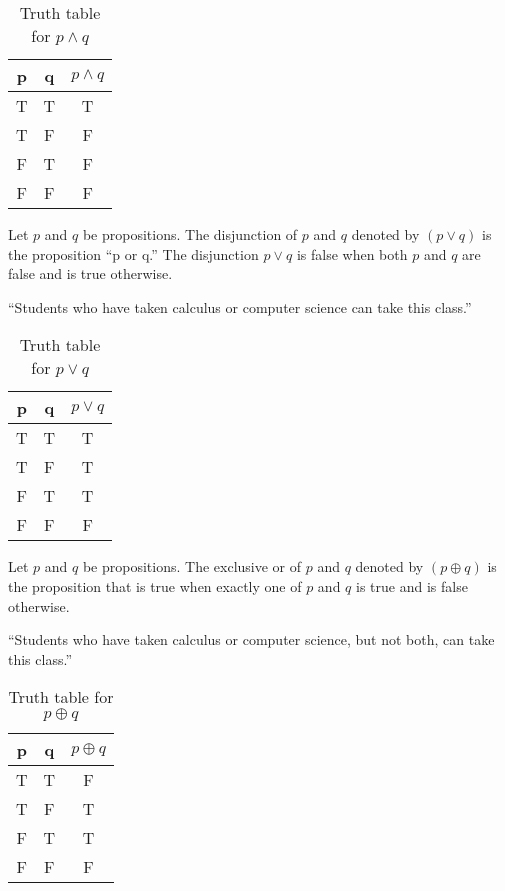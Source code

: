 \documentclass[../main-sheet.tex]{subfiles}
\begin{document}
\begin{table}[H]
    \centering
    \begin{tabular}{ccc}
        \toprule
        p & q & \(p\wedge q\) \\ \midrule
        T & T & T             \\ 
        T & F & F             \\ 
        F & T & F             \\ 
        F & F & F             \\ \bottomrule
    \end{tabular}
    \caption{Truth table for \(p\wedge q\)}
\end{table}
\begin{defn}
    Let \(p\) and \(q\) be propositions. The disjunction of \(p\) and \(q\) denoted by \((p \vee q)\) is the proposition ``p or q.'' The disjunction \(p\vee q\) is false when both \(p\) and \(q\) are false and is true otherwise.
\end{defn}
``Students who have taken calculus or computer science can take this class.''
\begin{table}[H]
    \centering
    \begin{tabular}{ccc}
        \toprule
        p & q & \(p\vee q\) \\ \midrule
        T & T & T           \\ 
        T & F & T           \\ 
        F & T & T           \\ 
        F & F & F           \\ \bottomrule
    \end{tabular}
    \caption{Truth table for \(p\vee q\)}
\end{table}
\begin{defn}
    Let \(p\) and \(q\) be propositions. The exclusive or of \(p\) and \(q\) denoted by \((p \oplus q)\) is the proposition that is true when exactly one of \(p\) and \(q\) is true and is false otherwise.
\end{defn}
``Students who have taken calculus or computer science, but not both, can take this class.''
\begin{table}[H]
    \centering
    \begin{tabular}{ccc}
        \toprule
        p & q & \(p\oplus q\) \\ \midrule
        T & T & F             \\ 
        T & F & T             \\ 
        F & T & T             \\ 
        F & F & F             \\ \bottomrule
    \end{tabular}
    \caption{Truth table for \(p\oplus q\)}
\end{table}
\end{document}
